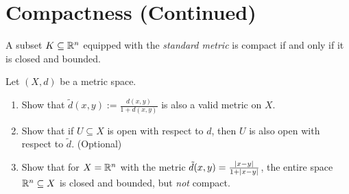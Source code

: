 \setcounter{section}{2} %

\section{Compactness (Continued)}

\begin{theorem*}
A subset $K \subseteq \mathbb{R}^n$ equipped with the \emph{standard metric} is compact if and only if it is closed and bounded.
\end{theorem*}


\begin{exercise*}
Let $(X, d)$ be a metric space.
\begin{enumerate}
    \item Show that $\tilde{d}(x,y) := \frac{d(x,y)}{1 + d(x,y)}$ is also a valid metric on $X$.
    \item Show that if $U \subseteq X$ is open with respect to $d$, then $U$ is also open with respect to $\tilde{d}$. \textcolor{eGray}{(Optional)}
    \item Show that for $X = \mathbb{R}^n$ with the metric $\tilde{d}(x,y) = \frac{\lvert x-y\rvert}{1+\lvert x-y\rvert}$, the entire space $\mathbb{R}^n \subseteq X$ is closed and bounded, but \emph{not} compact.
\end{enumerate}
\end{exercise*}

